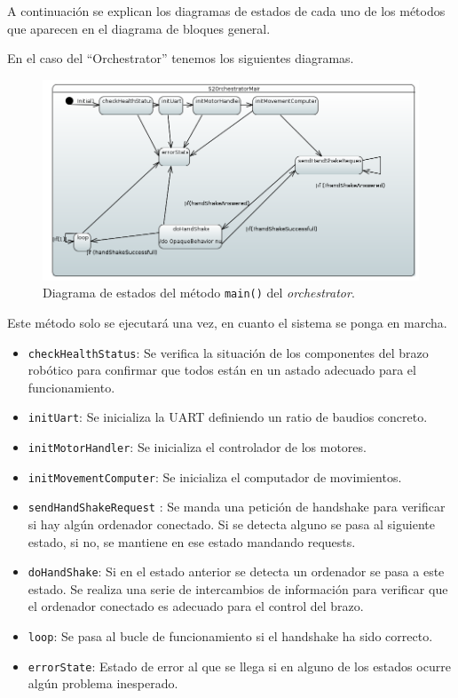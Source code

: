 A continuación se explican los diagramas de estados de cada uno de los métodos que aparecen en el diagrama de bloques general.

En el caso del ``Orchestrator'' tenemos los siguientes diagramas.

\begin{figure}[H]
    \centering
    \includegraphics[width=1\linewidth]{pictures/S2OrchestratorMain.PNG}
    \caption{Diagrama de estados del método \texttt{main()} del \textit{orchestrator}.}
    \label{fig:fun_main_orchestrator}
\end{figure}

Este método solo se ejecutará una vez, en cuanto el sistema se ponga en marcha. 

\begin{itemize}
    \item \texttt{checkHealthStatus}: Se verifica la situación de los componentes del brazo robótico para confirmar que todos están en un astado adecuado para el funcionamiento. 
    \item \texttt{initUart}: Se inicializa la UART definiendo un ratio de baudios concreto.
    \item \texttt{initMotorHandler}: Se inicializa el controlador de los motores.
    \item \texttt{initMovementComputer}: Se inicializa el computador de movimientos.
    \item \texttt{sendHandShakeRequest} : Se manda una petición de handshake para verificar si hay algún ordenador conectado. Si se detecta alguno se pasa al siguiente estado, si no, se mantiene en ese estado mandando requests.
    \item \texttt{doHandShake}: Si en el estado anterior se detecta un ordenador se pasa a este estado. Se realiza una serie de intercambios de información para verificar que el ordenador conectado es adecuado para el control del brazo.
    \item \texttt{loop}: Se pasa al bucle de funcionamiento si el handshake ha sido correcto.
    \item \texttt{errorState}: Estado de error al que se llega si en alguno de los estados ocurre algún problema inesperado. 
    
    
\end{itemize}


